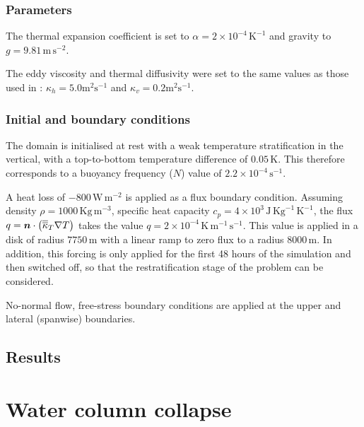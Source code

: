 \subsubsection{Parameters}
The thermal expansion coefficient is set to
$\alpha=2 \times 10^{-4} \,\mathrm{K}^{-1}$ and gravity to $g=9.81 \,\mathrm{m}\,\mathrm{s}^{-2}$.

The eddy viscosity
and thermal diffusivity were set to the same values as those
used in \cite{jones1993}: $\kappa_h = 5.0 \mathrm{m}^2\mathrm{s}^{-1}$ and
$\kappa_v = 0.2 \mathrm{m}^2\mathrm{s}^{-1}$.


\subsubsection{Initial and boundary conditions}
The domain is initialised at rest with a weak temperature stratification
in the vertical, with a top-to-bottom temperature difference of
$0.05\,$K.
This therefore corresponds to a buoyancy frequency ($N$) value
of $2.2 \times 10^{-4} \,\mathrm{s}^{-1}$.


A heat loss of $-800\,\mathrm{W}\,\mathrm{m}^{-2}$ is
applied as a flux boundary condition. Assuming density $\rho=1000\,\mathrm{Kg}\,\mathrm{m}^{-3}$,
specific heat capacity $c_p=4\times 10^3\,\mathrm{J}\,\mathrm{Kg}^{-1}\,\mathrm{K}^{-1}$,
the flux $q={\mbox{\boldmath$n$}}\cdot\left ( \overline{\overline{\kappa}}_T  \nabla T\right)$
takes the value $q = 2\times 10^{-4}\,\mathrm{K}\,\mathrm{m}^{-1}\,\mathrm{s}^{-1}$.
This value is applied in a disk of radius $7750\,\mathrm{m}$ with a linear ramp to zero flux to a radius
$8000\,\mathrm{m}$. In addition, this forcing is only applied for the first 48 hours of the simulation and
then switched off, so that the restratification stage of the problem can be considered.



No-normal flow, free-stress boundary conditions are applied at the upper and lateral
(spanwise) boundaries.


\subsection{Results}




\section{Water column collapse}

